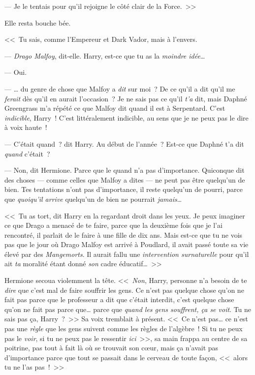 --- Je le tentais pour qu'il rejoigne le côté clair de la Force.~>>

Elle resta bouche bée.

<<~Tu sais, comme l'Empereur et Dark Vador, mais à l'envers.

--- \emph{Drago Malfoy}, dit-elle. Harry, est-ce que tu as la \emph{moindre idée}…

--- Oui.

--- … du genre de chose que Malfoy a \emph{dit} sur moi~? De ce qu'il a dit qu'il me \emph{ferait} dès qu'il en aurait l'occasion~? Je ne sais pas ce qu'il \emph{t'a} dit, mais Daphné Greengrass m'a répété ce que Malfoy dit quand il est à Serpentard. C'est \emph{indicible}, Harry~! C'est littéralement indicible, au sens que je ne peux pas le dire à voix haute~!

--- C'était quand~? dit Harry. Au début de l'année~? Est-ce que Daphné t'a dit \emph{quand} c'était~?

--- Non, dit Hermione. Parce que le quand n'a pas d'importance. Quiconque dit des choses — comme celles que Malfoy a dites — ne peut pas être quelqu'un de bien. Tes tentations n'ont pas d'importance, il reste quelqu'un de pourri, parce que \emph{quoiqu'il arrive} quelqu'un de bien ne pourrait \emph{jamais}…

<<~Tu as tort, dit Harry en la regardant droit dans les yeux. Je peux imaginer ce que Drago a menacé de te faire, parce que la deuxième fois que je l'ai rencontré, il parlait de le faire à une fille de dix ans. Mais est-ce que tu ne vois pas que le jour où Drago Malfoy est arrivé à Poudlard, il avait passé toute sa vie élevé par des \emph{Mangemorts}. Il aurait fallu une \emph{intervention surnaturelle} pour qu'il ait \emph{ta} moralité étant donné \emph{son} cadre éducatif…~>>

Hermione secoua violemment la tête. <<~\emph{Non}, Harry, personne n'a besoin de te \emph{dire} que c'est mal de faire souffrir les gens. Ce n'est pas quelque chose qu'on ne fait pas parce que le professeur a dit que c'était interdit, c'est quelque chose qu'on ne fait pas parce que… parce que \emph{quand les gens souffrent, ça se voit}. Tu ne sais pas ça, Harry~?~>> Sa voix tremblait à présent. <<~Ce n'est pas… ce n'est pas une \emph{règle} que les gens suivent comme les règles de l'algèbre~! Si tu ne peux pas le \emph{voir}, si tu ne peux pas le ressentir \emph{ici}~>>, sa main frappa au centre de sa poitrine, pas tout à fait là où se trouvait son cœur, mais ça n'avait pas d'importance parce que tout se passait dans le cerveau de toute façon, <<~alors tu ne l'as pas~!~>>

